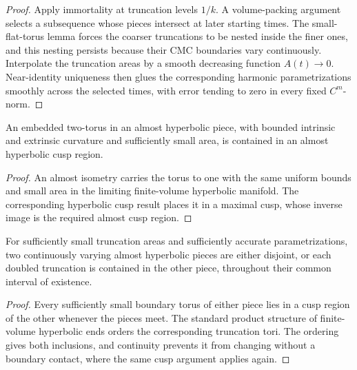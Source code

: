 \begin{proof}
Apply immortality at truncation levels \(1/k\).  A volume-packing argument
selects a subsequence whose pieces intersect at later starting times.  The
small-flat-torus lemma forces the coarser truncations to be nested inside the
finer ones, and this nesting persists because their CMC boundaries vary
continuously.  Interpolate the truncation areas by a smooth decreasing function
\(A(t)\to0\).  Near-identity uniqueness then glues the corresponding harmonic
parametrizations smoothly across the selected times, with error tending to zero
in every fixed \(C^m\)-norm.
\end{proof}

\begin{lemma}
\label{lem:chow-iv-small-flat-torus-in-cusp}
An embedded two-torus in an almost hyperbolic piece, with bounded intrinsic and
extrinsic curvature and sufficiently small area, is contained in an almost
hyperbolic cusp region.
\end{lemma}

\begin{proof}
An almost isometry carries the torus to one with the same uniform bounds and
small area in the limiting finite-volume hyperbolic manifold.  The
corresponding hyperbolic cusp result places it in a maximal cusp, whose inverse
image is the required almost cusp region.
\end{proof}

\begin{lemma}
\label{lem:chow-iv-almost-hyperbolic-pieces-disjoint}
For sufficiently small truncation areas and sufficiently accurate
parametrizations, two continuously varying almost hyperbolic pieces are either
disjoint, or each doubled truncation is contained in the other piece, throughout
their common interval of existence.
\end{lemma}

\begin{proof}
Every sufficiently small boundary torus of either piece lies in a cusp region
of the other whenever the pieces meet.  The standard product structure of
finite-volume hyperbolic ends orders the corresponding truncation tori.  The
ordering gives both inclusions, and continuity prevents it from changing
without a boundary contact, where the same cusp argument applies again.
\end{proof}

